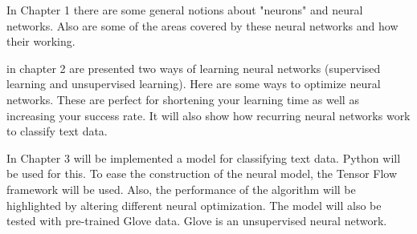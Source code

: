 In Chapter 1 there are some general notions about "neurons" and neural networks. Also are some of the areas covered by these neural networks and how their working.
 
in chapter 2 are presented two ways of learning neural networks (supervised learning and unsupervised learning). Here are some ways to optimize neural networks. These are perfect for shortening your learning time as well as increasing your success rate. It will also show how recurring neural networks work to classify text data.
 
In Chapter 3 will be implemented a model for classifying text data. Python will be used for this. To ease the construction of the neural model, the Tensor Flow framework will be used. Also, the performance of the algorithm will be highlighted by altering different neural optimization. The model will also be tested with pre-trained Glove data. Glove is an unsupervised neural network.